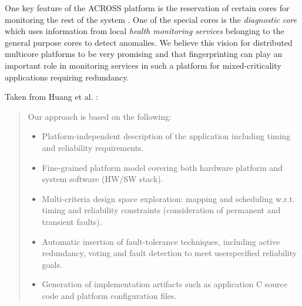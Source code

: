 
One key feature of the ACROSS platform is the reservation of certain cores for monitoring the rest of the system \cite{kopetz2007automotive}. One of the special cores is the \textit{diagnostic core} which uses information from local \textit{health monitoring services} belonging to the general purpose cores to detect anomalies. We believe this vision for distributed multicore platforms to be very promising and that fingerprinting can play an important role in monitoring services in such a platform for mixed-criticality applications requiring redundancy. 

Taken from Huang et al. \cite{huang2014framework}:
\begin{quote}
Our approach is based on the following:
\begin{itemize}
\item Platform-independent description of the application including timing and reliability requirements.
\item Fine-grained platform model covering both hardware platform
and system software (HW/SW stack).

\item Multi-criteria design space exploration: mapping and scheduling w.r.t. timing and reliability constraints (consideration of
permanent and transient faults).
\item Automatic insertion of fault-tolerance techniques, including
active redundancy, voting and fault detection to meet userspecified reliability goals.
\item Generation of implementation artifacts such as application C
source code and platform configuration files.
\end{itemize}
\end{quote}

